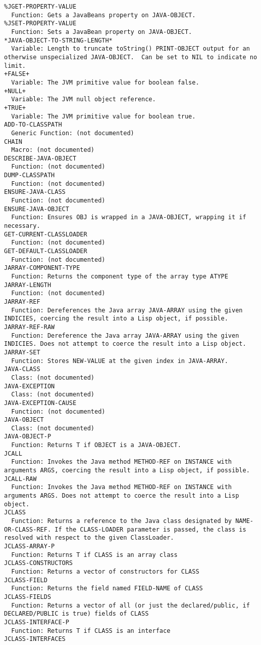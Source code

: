 \begin{verbatim}
%JGET-PROPERTY-VALUE
  Function: Gets a JavaBeans property on JAVA-OBJECT.
%JSET-PROPERTY-VALUE
  Function: Sets a JavaBean property on JAVA-OBJECT.
*JAVA-OBJECT-TO-STRING-LENGTH*
  Variable: Length to truncate toString() PRINT-OBJECT output for an otherwise unspecialized JAVA-OBJECT.  Can be set to NIL to indicate no limit.
+FALSE+
  Variable: The JVM primitive value for boolean false.
+NULL+
  Variable: The JVM null object reference.
+TRUE+
  Variable: The JVM primitive value for boolean true.
ADD-TO-CLASSPATH
  Generic Function: (not documented)
CHAIN
  Macro: (not documented)
DESCRIBE-JAVA-OBJECT
  Function: (not documented)
DUMP-CLASSPATH
  Function: (not documented)
ENSURE-JAVA-CLASS
  Function: (not documented)
ENSURE-JAVA-OBJECT
  Function: Ensures OBJ is wrapped in a JAVA-OBJECT, wrapping it if necessary.
GET-CURRENT-CLASSLOADER
  Function: (not documented)
GET-DEFAULT-CLASSLOADER
  Function: (not documented)
JARRAY-COMPONENT-TYPE
  Function: Returns the component type of the array type ATYPE
JARRAY-LENGTH
  Function: (not documented)
JARRAY-REF
  Function: Dereferences the Java array JAVA-ARRAY using the given INDICIES, coercing the result into a Lisp object, if possible.
JARRAY-REF-RAW
  Function: Dereference the Java array JAVA-ARRAY using the given INDICIES. Does not attempt to coerce the result into a Lisp object.
JARRAY-SET
  Function: Stores NEW-VALUE at the given index in JAVA-ARRAY.
JAVA-CLASS
  Class: (not documented)
JAVA-EXCEPTION
  Class: (not documented)
JAVA-EXCEPTION-CAUSE
  Function: (not documented)
JAVA-OBJECT
  Class: (not documented)
JAVA-OBJECT-P
  Function: Returns T if OBJECT is a JAVA-OBJECT.
JCALL
  Function: Invokes the Java method METHOD-REF on INSTANCE with arguments ARGS, coercing the result into a Lisp object, if possible.
JCALL-RAW
  Function: Invokes the Java method METHOD-REF on INSTANCE with arguments ARGS. Does not attempt to coerce the result into a Lisp object.
JCLASS
  Function: Returns a reference to the Java class designated by NAME-OR-CLASS-REF. If the CLASS-LOADER parameter is passed, the class is resolved with respect to the given ClassLoader.
JCLASS-ARRAY-P
  Function: Returns T if CLASS is an array class
JCLASS-CONSTRUCTORS
  Function: Returns a vector of constructors for CLASS
JCLASS-FIELD
  Function: Returns the field named FIELD-NAME of CLASS
JCLASS-FIELDS
  Function: Returns a vector of all (or just the declared/public, if DECLARED/PUBLIC is true) fields of CLASS
JCLASS-INTERFACE-P
  Function: Returns T if CLASS is an interface
JCLASS-INTERFACES

\end{verbatim}
